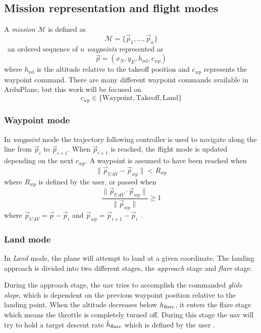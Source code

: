 \subsection{Mission representation and flight modes}\label{sec:mission}
A \textit{mission} $\mathcal{M}$ is defined as 
\begin{equation}
    \mathcal{M} = \{\vec{p}_1, \hdots, \vec{p}_n\}
\end{equation}
\ie\  an ordered sequence of $n$ \textit{waypoints} represented as 
\begin{equation}
    \vec{p}=(x_N, y_E, h_{\text{rel}}, c_{wp})
\end{equation}
where $h_{\text{rel}}$ is the altitude relative to the takeoff position and $c_{wp}$ represents the waypoint command. There are many different waypoint commands available
in ArduPlane, but this work will be focused on 
\begin{equation}
    c_{wp}\in \{\text{Waypoint}, \text{Takeoff}, \text{Land}\}
\end{equation}
\subsubsection{Waypoint mode}
In \textit{waypoint} mode the trajectory following controller is used
to navigate along the line from $\vec{p}_i$ to $\vec{p}_{i+1}$. When $\vec{p}_{i+1}$ is reached, the flight mode
is updated depending on the next $c_{wp}$. A waypoint is assumed to have been reached when
\begin{equation}
    \|\vec{p}_{UAV}-\vec{p}_{wp}\| < R_{wp}
\end{equation}
where $R_{wp}$ is defined by the user, or passed when
\begin{equation}
    \frac{\|\vec{p}_{UAV}\cdot \vec{p}_{wp}\|}{\|\vec{p}_{wp}\|}
     \geq 1
\end{equation}
where $\vec{p}_{UAV}=\vec{p}-\vec{p}_i$ and $\vec{p}_{wp}=\vec{p}_{i+1}-\vec{p}_i$ \cite{ardupilot_auto}.
\subsubsection{Land mode}
In \textit{Land} mode, the plane will attempt to land at a given coordinate. The landing approach 
is divided into two different stages, the \textit{approach} stage and \textit{flare} stage.

During the approach stage, the \ac{uav} tries to accomplish the commanded \textit{glide slope}, which is
dependent on the previous waypoint position relative to the landing point. When the altitude decreases
below $h_{\text{flare}}$, it enters the flare stage which means the throttle is completely turned off. 
During this stage the \ac{uav} will try to hold a target descent rate $\dot{h}_{\text{flare}}$ which is
defined by the user \cite{ardupilot_land}.